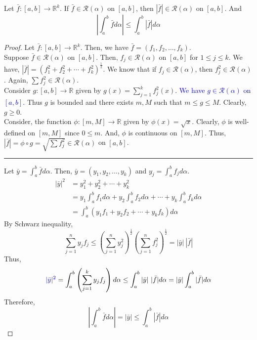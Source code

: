 \begin{theorem}
	Let $\bar{f} : [a,b] \to \mathbb{R}^k$.
	If $\bar{f} \in \mathscr{R}(\alpha)$ on $[a,b]$, then $|\bar{f}| \in \mathscr{R}(\alpha)$ on $[a,b]$.
	And
	\[ \left| \int_a^b \bar{f} d\alpha \right| \le \int_a^b |\bar{f}| d\alpha \]
\end{theorem}
\begin{proof}
	Let $\bar{f} : [a,b] \to \mathbb{R}^k$.
	Then, we have $\bar{f} = (f_1,f_2,\dots,f_k)$.\\
	Suppose $\bar{f} \in \mathscr{R}(\alpha)$ on $[a,b]$.
	Then, $f_j \in \mathscr{R}(\alpha)$ on $[a,b]$ for $1 \le j \le k$.
	We have, $|\bar{f}| = \left( f_1^2+f_2^2+\dotsb+f_k^2 \right)^\frac{1}{2}$.
	We know that if $f_j \in \mathscr{R}(\alpha)$, then $f_j^2 \in \mathscr{R}(\alpha)$.
	Again, $\sum f_j^2 \in \mathscr{R}(\alpha)$.\\

	Consider $g : [a,b] \to \mathbb{R}$ given by $g(x) = \sum_{j=1}^k f_j^2(x)$.
	\textcolor{blue}{We have $g \in \mathscr{R}(\alpha)$ on $[a,b]$.}
	Thus $g$ is bounded and there exists $m,M$ such that $m \le g \le M$.
	Clearly, $g \ge 0$.\\

	Consider, the function $\phi : [m,M] \to \mathbb{R}$ given by $\phi(x) = \sqrt{x}$.
	Clearly, $\phi$ is well-defined on $[m,M]$ since $0 \le m$.
	And, $\phi$ is continuous on $[m,M]$.
	Thus, $|\bar{f}| = \phi \circ g = \sqrt{\sum f_j^2} \in \mathscr{R}(\alpha)$ on $[a,b]$.\\

	\hrule \vspace{1em}
	
	Let $\displaystyle \bar{y} = \int_a^b \bar{f} d\alpha$.
	Then, $\bar{y} = (y_1,y_2,\dots,y_k)$ and $\displaystyle y_j = \int_a^b f_j d\alpha$.
	\begin{align*}
	|\bar{y}|^2 
		& = y_1^2 + y_2^2 + \dotsb + y_k^2\\
		& = y_1 \int_a^b f_1 d\alpha + y_2 \int_a^b f_2 d\alpha + \dotsb + y_k \int_a^b f_k d\alpha \\
		& = \int_a^b (y_1f_1 + y_2f_2 + \dotsb + y_kf_k) d\alpha
	\end{align*}
	By Schwarz inequality,
		\[ \sum_{j=1}^n y_j f_j \le \left( \sum_{j=1}^n y_j^2 \right)^\frac{1}{2} \left( \sum_{j=1}^n f_j^2 \right)^\frac{1}{2} = |\bar{y}| \ |\bar{f}| \]
	Thus,
		\[ {\color{blue}|\bar{y}|^2} = \int_a^b \left( \sum_{j=1}^k y_jf_j \right) d\alpha \le \int_a^b |\bar{y}|\ |\bar{f}| d\alpha = |\bar{y}| \int_a^b |\bar{f}| d\alpha \]
	Therefore,
		\[ \left| \int_a^b \bar{f} d\alpha \right| = |\bar{y}| \le \int_a^b |\bar{f}| d\alpha \]

\end{proof}

